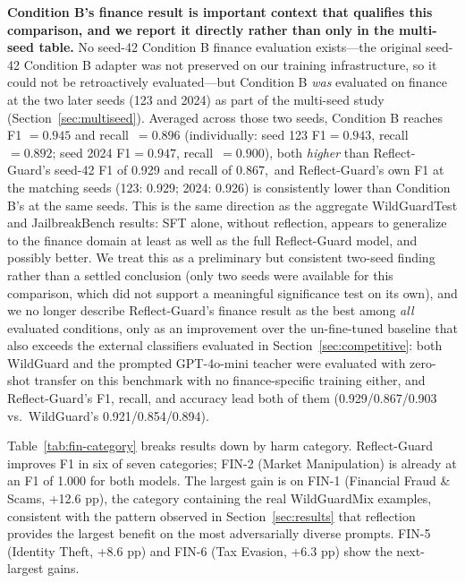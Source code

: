 \documentclass[superintelligence,article,accept,moreauthors]{Definitions/mdpi}
\begin{document}
\textbf{Condition B's finance result is important context that qualifies this comparison, and we report it directly rather than only in the multi-seed table.} No seed-42 Condition B finance evaluation exists---the original seed-42 Condition B adapter was not preserved on our training infrastructure, so it could not be retroactively evaluated---but Condition B \emph{was} evaluated on finance at the two later seeds (123 and 2024) as part of the multi-seed study (Section~\ref{sec:multiseed}). Averaged across those two seeds, Condition B reaches F1 $=0.945$ and \mbox{recall $=0.896$} (individually: seed 123 F1$=0.943$, \mbox{recall $=0.892$;} seed 2024 F1$=0.947$, \mbox{recall $=0.900$}), both \emph{higher} than Reflect-Guard's seed-42 F1 of 0.929 and recall of \mbox{0.867, and} Reflect-Guard's own F1 at the matching seeds (123: 0.929; 2024: 0.926) is consistently lower than Condition B's at the same seeds. This is the same direction as the aggregate WildGuardTest and JailbreakBench results: SFT alone, without reflection, appears to generalize to the finance domain at least as well as the full Reflect-Guard model, and possibly better. We treat this as a preliminary but consistent two-seed finding rather than a settled conclusion (only two seeds were available for this comparison, which did not support a meaningful significance test on its own), and we no longer describe Reflect-Guard's finance result as the best among \emph{all} evaluated conditions, only as an improvement over the un-fine-tuned baseline that also exceeds the external classifiers evaluated in Section~\ref{sec:competitive}: both WildGuard and the prompted GPT-4o-mini teacher were evaluated with zero-shot transfer on this benchmark with no finance-specific training either, and Reflect-Guard's F1, recall, and accuracy lead both of them (0.929/0.867/0.903 vs.\ WildGuard's 0.921/0.854/0.894). %


Table~\ref{tab:fin-category} breaks results down by harm category. Reflect-Guard improves F1 in six of seven categories; FIN-2 (Market Manipulation) is already at an F1 of 1.000 for both models. The largest gain is on FIN-1 (Financial Fraud \& Scams, +12.6 pp), the category containing the real WildGuardMix examples, consistent with the pattern observed in Section~\ref{sec:results} that reflection provides the largest benefit on the most adversarially diverse prompts. FIN-5 (Identity Theft, +8.6 pp) and FIN-6 (Tax Evasion, +6.3 pp) show the next-largest gains.
\end{document}
